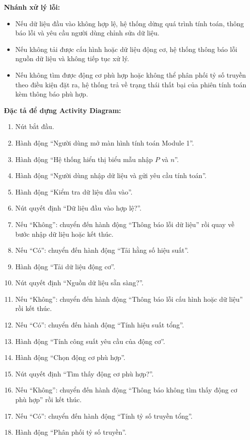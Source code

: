 \documentclass[a4paper]{article}
\begin{document}
\textbf{Nhánh xử lý lỗi:}
\begin{itemize}
\item Nếu dữ liệu đầu vào không hợp lệ, hệ thống dừng quá trình tính toán, thông báo lỗi và yêu cầu người dùng chỉnh sửa dữ liệu.
\item Nếu không tải được cấu hình hoặc dữ liệu động cơ, hệ thống thông báo lỗi nguồn dữ liệu và không tiếp tục xử lý.
\item Nếu không tìm được động cơ phù hợp hoặc không thể phân phối tỷ số truyền theo điều kiện đặt ra, hệ thống trả về trạng thái thất bại của phiên tính toán kèm thông báo phù hợp.
\end{itemize}

\textbf{Đặc tả để dựng Activity Diagram:}
\begin{enumerate}
\item Nút bắt đầu.
\item Hành động ``Người dùng mở màn hình tính toán Module 1''.
\item Hành động ``Hệ thống hiển thị biểu mẫu nhập \(P\) và \(n\)''.
\item Hành động ``Người dùng nhập dữ liệu và gửi yêu cầu tính toán''.
\item Hành động ``Kiểm tra dữ liệu đầu vào''.
\item Nút quyết định ``Dữ liệu đầu vào hợp lệ?''.
\item Nếu ``Không'': chuyển đến hành động ``Thông báo lỗi dữ liệu'' rồi quay về bước nhập dữ liệu hoặc kết thúc.
\item Nếu ``Có'': chuyển đến hành động ``Tải hằng số hiệu suất''.
\item Hành động ``Tải dữ liệu động cơ''.
\item Nút quyết định ``Nguồn dữ liệu sẵn sàng?''.
\item Nếu ``Không'': chuyển đến hành động ``Thông báo lỗi cấu hình hoặc dữ liệu'' rồi kết thúc.
\item Nếu ``Có'': chuyển đến hành động ``Tính hiệu suất tổng''.
\item Hành động ``Tính công suất yêu cầu của động cơ''.
\item Hành động ``Chọn động cơ phù hợp''.
\item Nút quyết định ``Tìm thấy động cơ phù hợp?''.
\item Nếu ``Không'': chuyển đến hành động ``Thông báo không tìm thấy động cơ phù hợp'' rồi kết thúc.
\item Nếu ``Có'': chuyển đến hành động ``Tính tỷ số truyền tổng''.
\item Hành động ``Phân phối tỷ số truyền''.

\end{enumerate}
\end{document}
